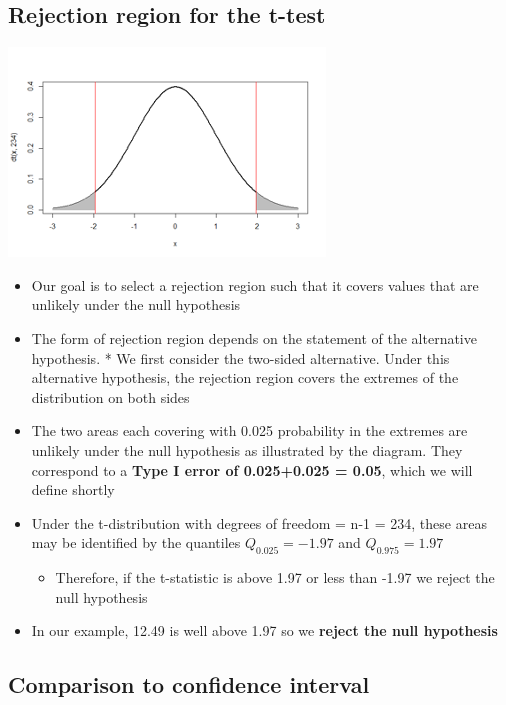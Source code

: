 \documentclass[
]{book}
\providecommand{\tightlist}{%
  \setlength{\itemsep}{0pt}\setlength{\parskip}{0pt}}
\begin{document}
\hypertarget{rejection-region-for-the-t-test}{%
\subsection{Rejection region for the t-test}\label{rejection-region-for-the-t-test}}

\includegraphics[width=0.5\linewidth]{./4_15}

\begin{itemize}
\tightlist
\item
  Our goal is to select a rejection region such that it covers values that are unlikely under the null hypothesis
\item
  The form of rejection region depends on the statement of the alternative hypothesis. * We first consider the two-sided alternative. Under this alternative hypothesis, the rejection region covers the extremes of the distribution on both sides
\item
  The two areas each covering with 0.025 probability in the extremes are unlikely under the null hypothesis as illustrated by the diagram. They correspond to a \textbf{Type I error of 0.025+0.025 = 0.05}, which we will define shortly
\item
  Under the t-distribution with degrees of freedom = n-1 = 234, these areas may be identified by the quantiles \(Q_{0.025} = -1.97\) and \(Q_{0.975} = 1.97\)

  \begin{itemize}
  \tightlist
  \item
    Therefore, if the t-statistic is above 1.97 or less than -1.97 we reject the null hypothesis
  \end{itemize}
\item
  In our example, 12.49 is well above 1.97 so we \textbf{reject the null hypothesis}
\end{itemize}

\hypertarget{comparison-to-confidence-interval}{%
\subsection{Comparison to confidence interval}\label{comparison-to-confidence-interval}}
\end{document}
